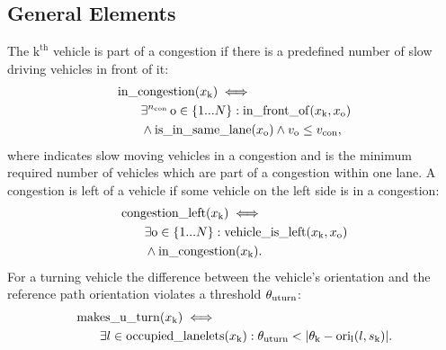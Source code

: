 \subsection{General Elements}
The $\text{k}^\text{th}$ vehicle is part of a congestion if there is a predefined number of slow driving vehicles in front of it:
\begin{align*}
\begin{split}
& \operatorname*{in\_congestion}(x_\text{k}) \iff  \\
&\qquad \exists^{n_\text{con}} \, \text{o} \in \{1 ... N\} : \operatorname*{in\_front\_of}(x_\text{k}, x_\text{o}) \\
&\qquad \land \operatorname*{is\_in\_same\_lane}(x_\text{o}) \land v_\text{o} \leq v_\text{con},
\end{split}
\end{align*} 
where \vCongestion indicates slow moving vehicles in a congestion and \numVehiclesCongestion is the minimum required number of vehicles which are part of a congestion within one lane.
A congestion is left of a vehicle if some vehicle on the left side is in a congestion:
\begin{align*}
\begin{split}
& \operatorname*{congestion\_left}(x_\text{k}) \iff  \\
&\qquad \exists \text{o} \in \{1 ... N\} : \operatorname*{vehicle\_is\_left}(x_\text{k}, x_\text{o})  \\
&\qquad \land \operatorname*{in\_congestion}(x_\text{k}). \\  
\end{split}
\end{align*} 
For a turning vehicle the difference between the vehicle's orientation and the reference path orientation violates a threshold $\theta_\text{uturn}$:
\begin{align*}
\begin{split}
& \operatorname*{makes\_u\_turn}(x_\text{k}) \iff  \\
&\qquad \exists l \in \operatorname*{occupied\_lanelets}(x_\text{k}): \theta_\text{uturn} < |\theta_\mathrm{k} - \mathrm{ori}_\mathrm{l}(l, s_\mathrm{k})|. \\  
\end{split}
\end{align*} 

